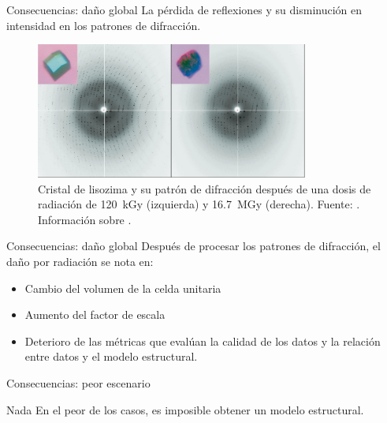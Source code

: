 \documentclass{beamer}
\begin{document}
\begin{frame}{Consecuencias: daño global}
\label{teng}	
La pérdida de reflexiones y su disminución en intensidad en los patrones de difracción. 
 \begin{figure}[h]
  \centering
  \includegraphics[width=0.8\textwidth]{teng.png}
  \caption{Cristal de lisozima y su patrón de difracción después de una dosis de radiación de \SI{120}{\kilo\gray} (izquierda) y \SI{16.7}{\mega\gray} (derecha). Fuente: \cite{Teng2000}. Información sobre \hyperlink{backup:grays}{}. }
  \label{fig:teng2000}
 \end{figure}
\end{frame}
\begin{frame}{Consecuencias: daño global}
Después de procesar los patrones de difracción, el daño por radiación se nota en:
 \begin{itemize}
  \item Cambio del volumen de la celda unitaria
  \item Aumento del factor de escala
  \item Deterioro de las métricas que evalúan la calidad de los datos y la relación entre datos y el modelo estructural. 
 \end{itemize}
\end{frame}
\begin{frame}{Consecuencias: peor escenario}
 \begin{alertblock}{Nada}
En el peor de los casos, es imposible obtener un modelo estructural.
 \end{alertblock}
\end{frame}
\end{document}
